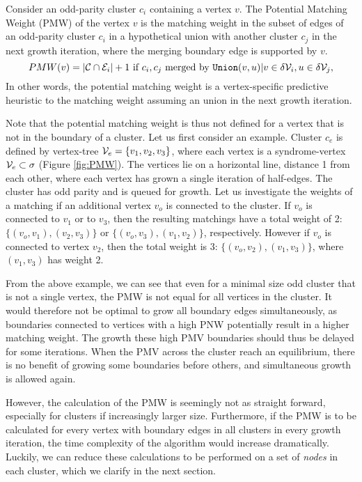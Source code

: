 \begin{definition}\label{def:pmw}
  Consider an odd-parity cluster $c_i$ containing a vertex $v$. The Potential Matching Weight (PMW) of the vertex $v$ is the matching weight in the subset of edges of an odd-parity cluster $c_i$ in a hypothetical union with another cluster $c_j$ in the next growth iteration, where the merging boundary edge is supported by $v$. 
  \begin{equation}
    PMW(v) = \abs{\mathcal{C} \cap \mathcal{E}_{i}} + 1 \text{ if } c_i, c_j \text{ merged by } \texttt{Union}(v,u) | v \in \delta\mathcal{V}_{i}, u \in \delta\mathcal{V}_{j}, 
  \end{equation}
  In other words, the potential matching weight is a vertex-specific predictive heuristic to the matching weight assuming an union in the next growth iteration. 
\end{definition}

Note that the potential matching weight is thus not defined for a vertex that is not in the boundary of a cluster. Let us first consider an example. Cluster $c_e$ is defined by vertex-tree $\mathcal{V}_e = \{v_1, v_2, v_3\}$, where each vertex is a syndrome-vertex $\mathcal{V}_e \subset \sigma$ (Figure \ref{fig:PMW}). The vertices lie on a horizontal line, distance 1 from each other, where each vertex has grown a single iteration of half-edges. The cluster has odd parity and is queued for growth. Let us investigate the weights of a matching if an additional vertex $v_o$ is connected to the cluster. If $v_o$ is connected to $v_1$ or to $v_3$, then the resulting matchings have a total weight of 2: $\{(v_o,v_1), (v_2,v_3)\}$ or $\{(v_o,v_3),(v_1,v_2)\}$, respectively. However if $v_o$ is connected to vertex $v_2$, then the total weight is 3: $\{(v_o, v_2),(v_1, v_3)\}$, where $(v_1,v_3)$ has weight 2. 

From the above example, we can see that even for a minimal size odd cluster that is not a single vertex, the PMW is not equal for all vertices in the cluster. It would therefore not be optimal to grow all boundary edges simultaneously, as boundaries connected to vertices with a high PNW potentially result in a higher matching weight. The growth these high PMV boundaries should thus be delayed for some iterations. When the PMV across the cluster reach an equilibrium, there is no benefit of growing some boundaries before others, and simultaneous growth is allowed again.



However, the calculation of the PMW is seemingly not as straight forward, especially for clusters if increasingly larger size. Furthermore, if the PMW is to be calculated for every vertex with boundary edges in all clusters in every growth iteration, the time complexity of the algorithm would increase dramatically. Luckily, we can reduce these calculations to be performed on a set of \emph{nodes} in each cluster, which we clarify in the next section.

